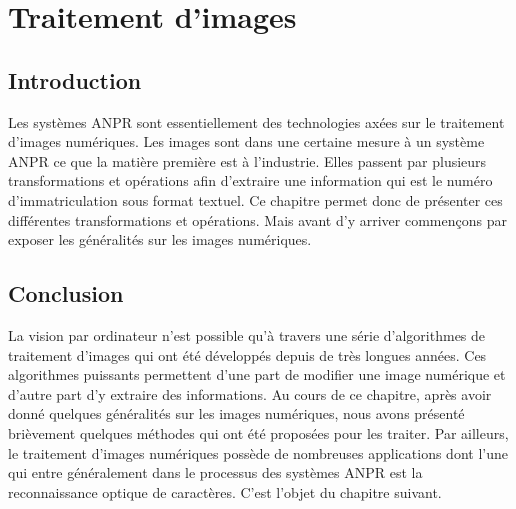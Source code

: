 \chapter{\textbf{Traitement d'images}}
    \section{Introduction}
    Les systèmes ANPR sont essentiellement des technologies axées sur le traitement d’images numériques. Les images sont dans une certaine mesure à un système ANPR ce que la matière première est à l’industrie. Elles passent par plusieurs transformations et opérations afin d'extraire une information qui est le numéro d’immatriculation sous format textuel. Ce chapitre permet donc de présenter ces différentes transformations et opérations. Mais avant d’y arriver commençons par exposer les généralités sur les images numériques.

    
    


    \section{Conclusion}
    La vision par ordinateur n’est possible qu’à travers une série d’algorithmes de traitement d’images qui ont été développés depuis de très longues années. Ces algorithmes puissants permettent d’une part de modifier une image numérique  et d’autre part d'y  extraire des informations. Au cours de ce chapitre, après avoir donné quelques généralités sur les images numériques, nous avons présenté brièvement quelques méthodes qui ont été proposées pour les traiter. Par ailleurs, le traitement d’images numériques possède de nombreuses applications dont l’une qui entre généralement dans le processus des systèmes ANPR est la reconnaissance optique de caractères. C’est l’objet du chapitre suivant. 
